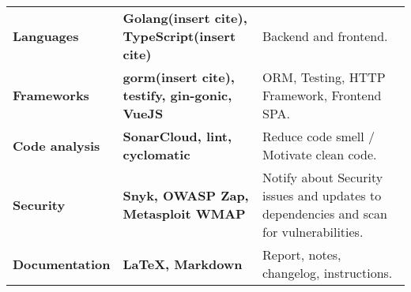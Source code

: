 {\begin{tabular}{| p{0.235\linewidth} | p{0.365\linewidth} | p{0.565\linewidth}|}
        \textbf{Languages} & \textbf{Golang(insert cite), TypeScript(insert cite)} & Backend and frontend. \\ 
        \textbf{Frameworks} & \textbf{gorm(insert cite), testify\cite{tool:testify}, gin-gonic, VueJS} & ORM, Testing, HTTP Framework, Frontend SPA. \\
        \textbf{Code analysis} & \textbf{SonarCloud, lint, cyclomatic} & Reduce code smell / Motivate clean code. \\
        \textbf{Security} & \textbf{Snyk, OWASP Zap, Metasploit WMAP} & Notify about Security issues and updates to dependencies and scan for vulnerabilities. \\

        \textbf{Documentation} & \textbf{LaTeX, Markdown} & Report, notes, changelog, instructions. \\


        \hline

    \end{tabular}
}
